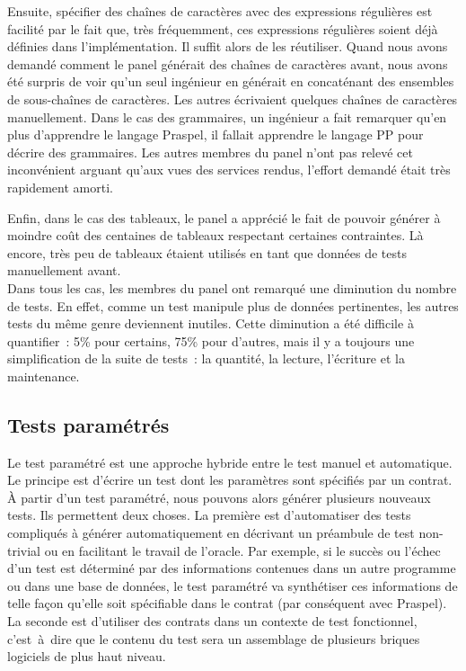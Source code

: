 Ensuite, spécifier des chaînes de caractères avec des expressions régulières est
facilité par le fait que, très fréquemment, ces expressions régulières soient
déjà définies dans l'implémentation. Il suffit alors de les réutiliser.  Quand
nous avons demandé comment le panel générait des chaînes de caractères avant,
nous avons été surpris de voir qu'un seul ingénieur en générait en concaténant
des ensembles de sous-chaînes de caractères. Les autres écrivaient quelques
chaînes de caractères manuellement. Dans le cas des grammaires, un ingénieur a
fait remarquer qu'en plus d'apprendre le langage Praspel, il fallait apprendre
le langage PP pour décrire des grammaires. Les autres membres du panel n'ont pas
relevé cet inconvénient arguant qu'aux vues des services rendus, l'effort
demandé était très rapidement amorti.

Enfin, dans le cas des tableaux, le panel a apprécié le fait de pouvoir générer
à moindre coût des centaines de tableaux respectant certaines contraintes. Là
encore, très peu de tableaux étaient utilisés en tant que données de tests
manuellement avant. \\

Dans tous les cas, les membres du panel ont remarqué une diminution du nombre de
tests. En effet, comme un test manipule plus de données pertinentes, les autres
tests du même genre deviennent inutiles. Cette diminution a été difficile à
quantifier~: 5\% pour certains, 75\% pour d'autres, mais il y a toujours une
simplification de la suite de tests~: la quantité, la lecture, l'écriture et la
maintenance.

\subsection{Tests paramétrés}
\label{subsection:experimentation:parameterized}


Le test paramétré est une approche hybride entre le test manuel et automatique.
Le principe est d'écrire un test dont les paramètres sont spécifiés par un
contrat. À partir d'un test paramétré, nous pouvons alors générer plusieurs
nouveaux tests. Ils permettent deux choses. La première est d'automatiser des
tests compliqués à générer automatiquement en décrivant un préambule de test
non-trivial ou en facilitant le travail de l'oracle. Par exemple, si le succès
ou l'échec d'un test est déterminé par des informations contenues dans un autre
programme ou dans une base de données, le test paramétré va synthétiser ces
informations de telle façon qu'elle soit spécifiable dans le contrat (par
conséquent avec Praspel). La seconde est d'utiliser des contrats dans un
contexte de test fonctionnel, c'est~à~dire que le contenu du test sera un
assemblage de plusieurs briques logiciels de plus haut niveau.

